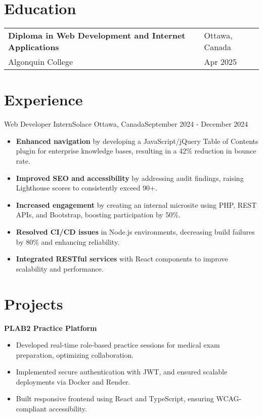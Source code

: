 \documentclass[a4paper,10pt]{article}
\begin{document}
\section{Education}
\begin{tabular}{ll}
\textbf{Diploma in Web Development and Internet Applications} & \hfill Ottawa, Canada \\
Algonquin College & \hfill Apr 2025 \\
\end{tabular}

\section{Experience}
\resumeSubheading
{Web Developer Intern}{Solace}
{Ottawa, Canada}{September 2024 - December 2024}
\begin{itemize}[leftmargin=0.15in, label={}]
    \item \textbf{Enhanced navigation} by developing a JavaScript/jQuery Table of Contents plugin for enterprise knowledge bases, resulting in a 42\% reduction in bounce rate.
    \item \textbf{Improved SEO and accessibility} by addressing audit findings, raising Lighthouse scores to consistently exceed 90+.
    \item \textbf{Increased engagement} by creating an internal microsite using PHP, REST APIs, and Bootstrap, boosting participation by 50\%.
    \item \textbf{Resolved CI/CD issues} in Node.js environments, decreasing build failures by 80\% and enhancing reliability.
    \item \textbf{Integrated RESTful services} with React components to improve scalability and performance.
\end{itemize}

\section{Projects}
\textbf{PLAB2 Practice Platform}
\begin{itemize}[leftmargin=0.15in, label={}]
    \item Developed real-time role-based practice sessions for medical exam preparation, optimizing collaboration.
    \item Implemented secure authentication with JWT, and ensured scalable deployments via Docker and Render.
    \item Built responsive frontend using React and TypeScript, ensuring WCAG-compliant accessibility.
\end{itemize}
\end{document}
